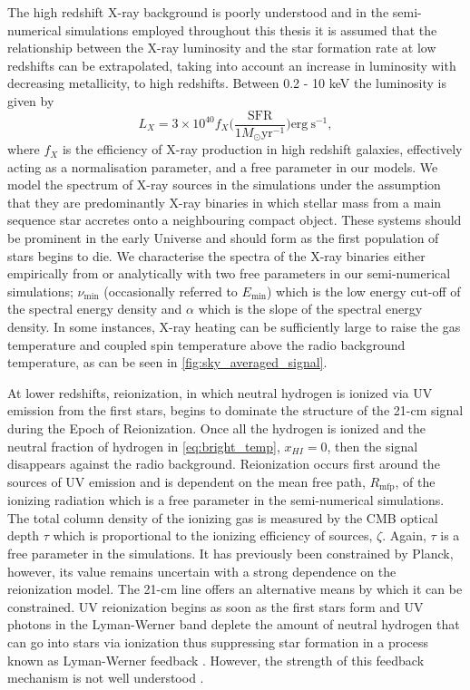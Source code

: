 The high redshift X-ray background is poorly understood and in the semi-numerical simulations employed throughout this thesis it is assumed that the relationship between the X-ray luminosity and the star formation rate at low redshifts can be extrapolated, taking into account an increase in luminosity with decreasing metallicity, to high redshifts. Between 0.2 - 10 keV the luminosity is given by
\begin{equation}
    L_X = 3\times 10 ^{40} f_X \bigg(\frac{\mathrm{SFR}}{1 M_\odot \mathrm{yr}^{-1}}\bigg) \mathrm{erg~s}^{-1},
\end{equation}
where $f_X$ is the efficiency of X-ray production in high redshift galaxies, effectively acting as a normalisation parameter, and a free parameter in our models. We model the spectrum of X-ray sources in the simulations under the assumption that they are predominantly X-ray binaries in which stellar mass from a main sequence star accretes onto a neighbouring compact object. These systems should be prominent in the early Universe and should form as the first population of stars begins to die. We characterise the spectra of the X-ray binaries either empirically from \cite{Fragos_Xrays_2013} or analytically with two free parameters in our semi-numerical simulations; $\nu_\mathrm{min}$ (occasionally referred to $E_\mathrm{min}$) which is the low energy cut-off of the spectral energy density and $\alpha$ which is the slope of the spectral energy density. %
In some instances, X-ray heating can be sufficiently large to raise the gas temperature and coupled spin temperature above the radio background temperature, as can be seen in \cref{fig:sky_averaged_signal}.

At lower redshifts, reionization, in which neutral hydrogen is ionized via UV emission from the first stars, begins to dominate the structure of the 21-cm signal during the Epoch of Reionization. Once all the hydrogen is ionized and the neutral fraction of hydrogen in \cref{eq:bright_temp}, $x_{HI} = 0$, then the signal disappears against the radio background. Reionization occurs first around the sources of UV emission and is dependent on the mean free path, $R_\mathrm{mfp}$, of the ionizing radiation which is a free parameter in the semi-numerical simulations. The total column density of the ionizing gas is measured by the CMB optical depth $\tau$ which is proportional to the ionizing efficiency of sources, $\zeta$. Again, $\tau$ is a free parameter in the simulations. It has previously been constrained by Planck, however, its value remains uncertain with a strong dependence on the reionization model. The 21-cm line offers an alternative means by which it can be constrained. UV reionization begins as soon as the first stars form and UV photons in the Lyman-Werner band deplete the amount of neutral hydrogen that can go into stars via ionization thus suppressing star formation in a process known as Lyman-Werner feedback \cite{Cohen_global_2017}. However, the strength of this feedback mechanism is not well understood \cite{Visbal_lw_2014}.

